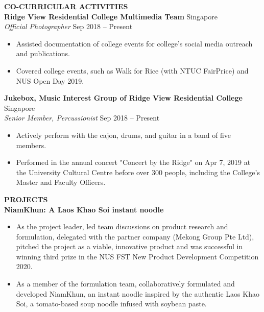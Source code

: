\documentclass[a4paper, 11pt]{article}
\newcommand{\interspace}{\vspace{10pt}}
\newcommand{\intraspace}{\vspace{5pt}}
\begin{document}
	\interspace
	
	\textbf{\large CO-CURRICULAR ACTIVITIES} \hrulefill \\
	\textbf{Ridge View Residential College Multimedia Team} \hfill Singapore\\
	\textit{Official Photographer} \hfill Sep 2018 -- Present
	\begin{itemize}[leftmargin=*, noitemsep, topsep=0pt]
		\item Assisted documentation of college events for college’s social media outreach and publications.
		\item Covered college events, such as Walk for Rice (with NTUC FairPrice) and NUS Open Day 2019.
	\end{itemize}
	\intraspace
	
	\textbf{Jukebox, Music Interest Group of Ridge View Residential College} \hfill Singapore\\
	\textit{Senior Member, Percussionist} \hfill Sep 2018 -- Present
	\begin{itemize}[leftmargin=*, noitemsep, topsep=0pt]
		\item Actively perform with the cajon, drums, and guitar in a band of five members.
		\item Performed in the annual concert "Concert by the Ridge" on Apr 7, 2019 at the University Cultural Centre before over 300 people, including the College’s Master and Faculty Officers.
	\end{itemize}

	\interspace

	\textbf{\large PROJECTS} \hrulefill \\
	\textbf{NiamKhun: A Laos Khao Soi instant noodle}
	\begin{itemize}[leftmargin=*, noitemsep, topsep=0pt]
		\item As the project leader, led team discussions on product research and formulation, delegated with the partner company (Mekong Group Pte Ltd), pitched the project as a viable, innovative product and was successful in winning third prize in the NUS FST New Product Development Competition 2020.
		\item As a member of the formulation team, collaboratively formulated and developed NiamKhun, an instant noodle inspired by the authentic Laos Khao Soi, a tomato-based soup noodle infused with soybean paste.
	\end{itemize}

	\intraspace
	
\end{document}
